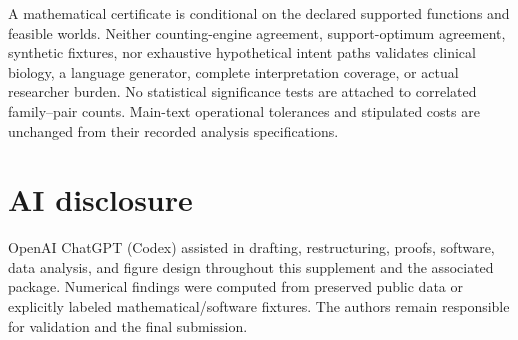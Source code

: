 \documentclass[10pt,letterpaper]{article}
\begin{document}
A mathematical certificate is conditional on the declared supported functions and feasible worlds. Neither counting-engine agreement, support-optimum agreement, synthetic fixtures, nor exhaustive hypothetical intent paths validates clinical biology, a language generator, complete interpretation coverage, or actual researcher burden. No statistical significance tests are attached to correlated family--pair counts. Main-text operational tolerances and stipulated costs are unchanged from their recorded analysis specifications.

\section*{AI disclosure}
OpenAI ChatGPT (Codex) assisted in drafting, restructuring, proofs, software, data analysis, and figure design throughout this supplement and the associated package. Numerical findings were computed from preserved public data or explicitly labeled mathematical/software fixtures. The authors remain responsible for validation and the final submission.

\end{document}
